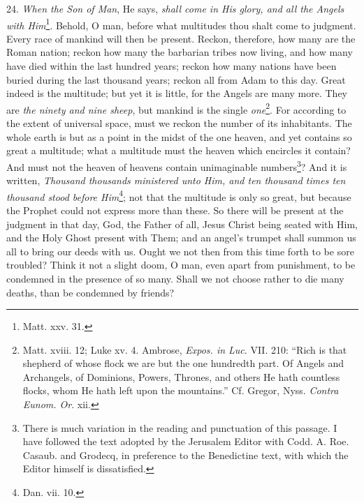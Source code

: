 24. \emph{When the Son of Man}, He says, \emph{shall come in His glory, and all the Angels with Him}\footnote{Matt. xxv. 31.}. Behold, O man, before what multitudes thou shalt come to judgment. Every race of mankind will then be present. Reckon, therefore, how many are the Roman nation; reckon how many the barbarian tribes now living, and how many have died within the last hundred years; reckon how many nations have been buried during the last thousand years; reckon all from Adam to this day. Great indeed is the multitude; but yet it is little, for the Angels are many more. They are \emph{the ninety and nine sheep}, but mankind is the single \emph{one}\footnote{Matt. xviii. 12; Luke xv. 4. Ambrose, \emph{Expos. in Luc}. VII. 210: “Rich is that shepherd of whose flock we are but the one hundredth part. Of Angels and Archangels, of Dominions, Powers, Thrones, and others He hath countless flocks, whom He hath left upon the mountains.” Cf. Gregor, Nyss. \emph{Contra Eunom. Or}. xii.}. For according to the extent of universal space, must we reckon the number of its inhabitants. The whole earth is but as a point in the midst of the one heaven, and yet contains so great a multitude; what a multitude must the heaven which encircles it contain? And must not the heaven of heavens contain unimaginable numbers\footnote{There is much variation in the reading and punctuation of this passage. I have followed the text adopted by the Jerusalem Editor with Codd. A. Roe. Casaub. and Grodecq, in preference to the Benedictine text, with which the Editor himself is dissatisfied.}? And it is written, \emph{Thousand thousands ministered unto Him, and ten thousand times ten thousand stood before Him}\footnote{Dan. vii. 10.}; not that the multitude is only so great, but because the Prophet could not express more than these. So there will be present at the judgment in that day, God, the Father of all, Jesus Christ being seated with Him, and the Holy Ghost present with Them; and an angel’s trumpet shall summon us all to bring our deeds with us. Ought we not then from this time forth to be sore troubled? Think it not a slight doom, O man, even apart from punishment, to be condemned in the presence of so many. Shall we not choose rather to die many deaths, than be condemned by friends?

